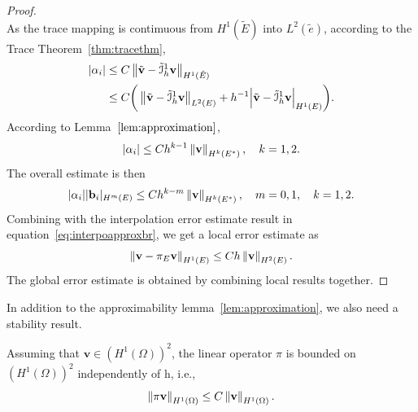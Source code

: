\begin{proof}
\begin{equation}
		  \end{equation}
As the trace mapping is contimuous from $H^1(\tilde{E})$ into $L^2(\tilde{e})$, according to the Trace Theorem~\ref{thm:tracethm},
		  \begin{equation}
					 \begin{aligned}
								\lvert \alpha_i \rvert &\leq C \left\lVert\tilde{\mathbf{v}} - 
								\tilde{\mathcal{I}}_h^1\mathbf{v}\right\rVert_{H^1(\tilde{E})}\\
								&\leq C \bigg( \left\lVert\tilde{\mathbf{v}} - 
								\tilde{\mathcal{I}}_h^1\mathbf{v}\right\rVert_{L^2(E)} + h^{-1} 
								\Big\lvert \tilde{\mathbf{v}} - 
								\tilde{\mathcal{I}}_h^1\mathbf{v}\Big\rvert_{H^1(E)}\bigg).
					 \end{aligned}
		  \end{equation}
		  According to Lemma~$\ref{lem:approximation}$,
		  \begin{equation}
					 \lvert \alpha_i \rvert \leq C h^{k-1}\left\lVert\mathbf{v}\right\rVert_{H^k(E^*)}, \quad k = 1,2. 
		  \end{equation}
The overall estimate is then
\begin{equation}\label{eq:estimationalphav}
		  \lvert\alpha_i \rvert \lvert \mathbf{b}_i \rvert_{H^m(E)} \leq C h^{k-m} \left\lVert \mathbf{v}\right\rVert_{H^k(E^*)}, \quad m=0,1, \quad k=1,2. 
\end{equation}
Combining with the interpolation error estimate result in equation~\eqref{eq:interpoapproxbr},
we get a local error estimate as
\begin{equation}
		  \left\lVert\mathbf{v} - \pi_E \mathbf{v}\right\rVert_{H^1(E)} \leq C h \left\lVert\mathbf{v}\right\rVert_{H^2(E)}.
\end{equation}
The global error estimate is obtained by combining local results together.
\end{proof}
In addition to the approximability lemma~\ref{lem:approximation}, we
also need a stability result.
\begin{lem}\label{lem:brstability}
		  Assuming that $\mathbf{v} \in (H^1(\Omega))^2$,
		  the linear operator $\pi$ is bounded on $(H^1(\Omega))^2$ independently of h, i.e., 
		  \begin{equation}\label{eq:mypiboundness}
					 \left\lVert\pi \mathbf{v}\right\rVert_{H^1(\Omega)} \leq C\left\lVert\mathbf{v}\right\rVert_{H^1(\Omega)}.
		  \end{equation}
\end{lem}
